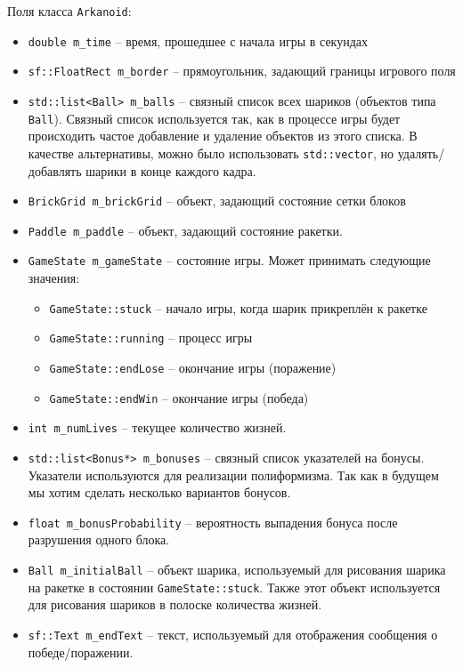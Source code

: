 \documentclass{article}
\begin{document}
Поля класса \texttt{Arkanoid}:
\begin{itemize}
\item \texttt{double m\_time} -- время, прошедшее с начала игры в секундах
\item \texttt{sf::FloatRect m\_border} -- прямоугольник, задающий границы игрового поля
\item \texttt{std::list<Ball> m\_balls} -- связный список всех шариков (объектов типа \texttt{Ball}). Связный список используется так, как в процессе игры будет происходить частое добавление и удаление объектов из этого списка. В качестве альтернативы, можно было использовать \texttt{std::vector}, но удалять/добавлять шарики в конце каждого кадра.
\item \texttt{BrickGrid m\_brickGrid} -- объект, задающий состояние сетки блоков
\item \texttt{Paddle m\_paddle} -- объект, задающий состояние ракетки.
\item \texttt{GameState m\_gameState} -- состояние игры. Может принимать следующие значения:
\begin{itemize}
\item \texttt{GameState::stuck} -- начало игры, когда шарик прикреплён к ракетке
\item \texttt{GameState::running} -- процесс игры
\item \texttt{GameState::endLose} -- окончание игры (поражение)
\item \texttt{GameState::endWin} -- окончание игры (победа)
\end{itemize}
\item \texttt{int m\_numLives} -- текущее количество жизней.
\item \texttt{std::list<Bonus*> m\_bonuses} -- связный список указателей на бонусы. Указатели используются для реализации полиформизма. Так как в будущем мы хотим сделать несколько вариантов бонусов.
\item \texttt{float m\_bonusProbability} -- вероятность выпадения бонуса после разрушения одного блока.
\item \texttt{Ball m\_initialBall} -- объект шарика, используемый для рисования шарика на ракетке в состоянии \texttt{GameState::stuck}. Также этот объект используется для рисования шариков в полоске количества жизней.
\item \texttt{sf::Text m\_endText} -- текст, используемый для отображения сообщения о победе/поражении.
\end{itemize}
\end{document}

